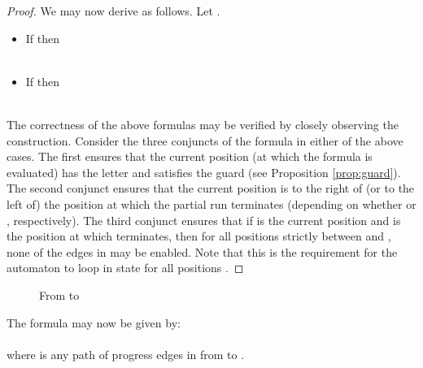 \documentclass{llncs}
\newcommand{\potdta}{\mbox{}}
\newcommand{\mitlfpinf}{\mbox{}}
\newcommand{\tab}{\hspace*{1cm}}
\begin{document}
\begin{proof}
We may now derive  as follows. Let .\\
\begin{itemize}
\item If  then\\
 \\
\tab \tab 
\item If  then\\
\\
\tab \tab 
\end{itemize}
The correctness of the above formulas may be verified by closely observing the construction. Consider the three conjuncts of the formula  in either of the above cases. The first ensures that the current position (at which the formula is evaluated) has the letter  and satisfies the guard  (see Proposition \ref{prop:guard}). The second conjunct ensures that the current position is to the right of (or to the left of) the position at which the partial run  terminates (depending on whether  or , respectively). The third conjunct ensures that if  is the current position and  is the position at which  terminates, then for all positions  strictly between  and , none of the edges in  may be enabled. Note that this is the requirement for the automaton to loop in state  for all positions .
\end{proof}

\begin{figure}
\begin{center}
\caption{From \potdta\/ to \mitlfpinf}
\label{fig:autm2form}
\end{center}
\end{figure}

The formula  may now be given by:\\
\\
where  is any path of progress edges in  from  to .\\
\end{document}
